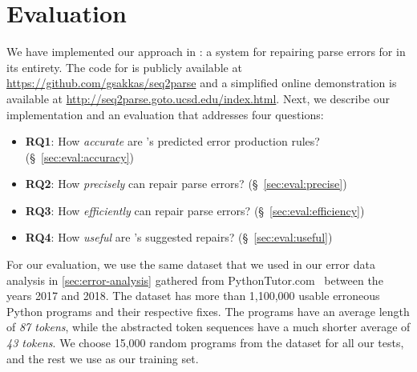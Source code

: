 \section{Evaluation}
\label{sec:eval}

We have implemented our approach in \toolname: a system for repairing parse
errors for \python in its entirety. The code for \toolname is publicly available
at \url{https://github.com/gsakkas/seq2parse} and a simplified online
demonstration is available at \url{http://seq2parse.goto.ucsd.edu/index.html}.
Next, we describe our implementation and an evaluation that addresses four
questions:

\begin{itemize}
    \item \textbf{RQ1}: How \emph{accurate} are \toolname's predicted error production rules?
                        (\S~\ref{sec:eval:accuracy})
    \item \textbf{RQ2}: How \emph{precisely} can \toolname repair parse errors?
                        (\S~\ref{sec:eval:precise})
    \item \textbf{RQ3}: How \emph{efficiently} can \toolname repair parse errors?
                        (\S~\ref{sec:eval:efficiency})
    \item \textbf{RQ4}: How \emph{useful} are \toolname's suggested repairs?
                        (\S~\ref{sec:eval:useful})
\end{itemize}


For our evaluation, we use the same \python dataset that we used in our error
data analysis in \autoref{sec:error-analysis} gathered from
PythonTutor.com~\citep{Guo2013} between the years 2017 and 2018. The dataset has
more than 1,100,000 usable erroneous Python programs and their respective fixes.
The programs have an average length of \emph{87 tokens}, while the abstracted
token sequences have a much shorter average of \emph{43 tokens}. We choose
15,000 random programs from the dataset for all our tests, and the rest we use
as our training set.

